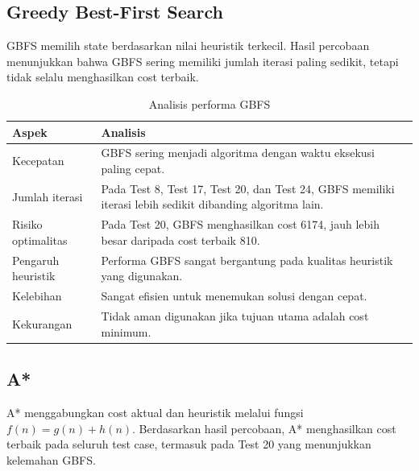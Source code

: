 \subsection{Greedy Best-First Search}

GBFS memilih state berdasarkan nilai heuristik terkecil. 
Hasil percobaan menunjukkan bahwa GBFS sering memiliki jumlah iterasi paling sedikit, tetapi tidak selalu menghasilkan cost terbaik.

\begin{table}[H]
	\centering
	\caption{Analisis performa GBFS}
	\begin{tabular}{|p{4cm}|p{10cm}|}
		\hline
		\rowcolor{orange!20}
		\textbf{Aspek} & \textbf{Analisis} \\
		\hline
		Kecepatan & GBFS sering menjadi algoritma dengan waktu eksekusi paling cepat. \\
		\hline
		Jumlah iterasi & Pada Test 8, Test 17, Test 20, dan Test 24, GBFS memiliki iterasi lebih sedikit dibanding algoritma lain. \\
		\hline
		Risiko optimalitas & Pada Test 20, GBFS menghasilkan cost 6174, jauh lebih besar daripada cost terbaik 810. \\
		\hline
		Pengaruh heuristik & Performa GBFS sangat bergantung pada kualitas heuristik yang digunakan. \\
		\hline
		Kelebihan & Sangat efisien untuk menemukan solusi dengan cepat. \\
		\hline
		Kekurangan & Tidak aman digunakan jika tujuan utama adalah cost minimum. \\
		\hline
	\end{tabular}
\end{table}

\subsection{A*}

A* menggabungkan cost aktual dan heuristik melalui fungsi $f(n)=g(n)+h(n)$. 
Berdasarkan hasil percobaan, A* menghasilkan cost terbaik pada seluruh test case, termasuk pada Test 20 yang menunjukkan kelemahan GBFS.

